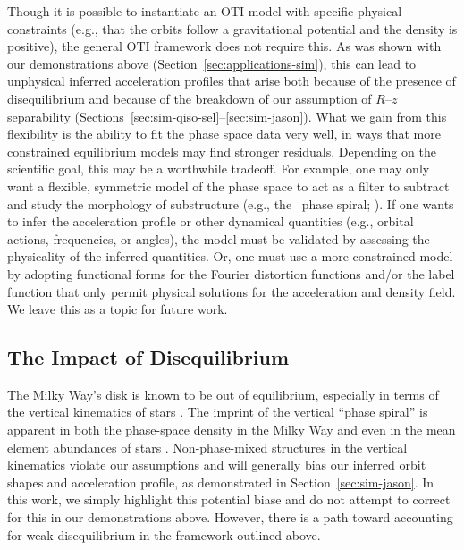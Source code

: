Though it is possible to instantiate an OTI model with specific physical constraints
(e.g., that the orbits follow a gravitational potential and the density is positive),
the general OTI framework does not require this.
As was shown with our demonstrations above (Section~\ref{sec:applications-sim}), this
can lead to unphysical inferred acceleration profiles that arise both because of the
presence of disequilibrium and because of the breakdown of our assumption of $R$--$z$
separability (Sections~\ref{sec:sim-qiso-sel}--\ref{sec:sim-jason}).
What we gain from this flexibility is the ability to fit the phase space data very well,
in ways that more constrained equilibrium models may find stronger residuals.
Depending on the scientific goal, this may be a worthwhile tradeoff.
For example, one may only want a flexible, symmetric model of the phase space to act as
a filter to subtract and study the morphology of substructure (e.g., the \gaia\ phase
spiral; \citealt{Antoja:2018}).
If one wants to infer the acceleration profile or other dynamical quantities (e.g.,
orbital actions, frequencies, or angles), the model must be validated by assessing the
physicality of the inferred quantities.
Or, one must use a more constrained model by adopting functional forms for the Fourier
distortion functions and/or the label function that only permit physical solutions for
the acceleration and density field.
We leave this as a topic for future work.


\subsection{The Impact of Disequilibrium} \label{sec:disc-diseq}

The Milky Way's disk is known to be out of equilibrium, especially in terms of the
vertical kinematics of stars \citep[e.g.,][]{Antoja:2018, TODO}.
The imprint of the vertical ``phase spiral'' is apparent in both the phase-space density
in the Milky Way and even in the mean element abundances of stars
\citep{Frankel:inprep}.
Non-phase-mixed structures in the vertical kinematics violate our assumptions and will
generally bias our inferred orbit shapes and acceleration profile, as demonstrated in
Section~\ref{sec:sim-jason}.
In this work, we simply highlight this potential biase and do not attempt to correct for
this in our demonstrations above.
However, there is a path toward accounting for weak disequilibrium in the framework
outlined above.

